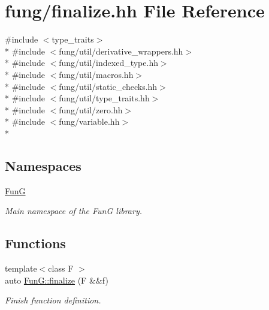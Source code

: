 \hypertarget{finalize_8hh}{}\section{fung/finalize.hh File Reference}
\label{finalize_8hh}
{\ttfamily \#include $<$type\+\_\+traits$>$}\\*
{\ttfamily \#include $<$fung/util/derivative\+\_\+wrappers.\+hh$>$}\\*
{\ttfamily \#include $<$fung/util/indexed\+\_\+type.\+hh$>$}\\*
{\ttfamily \#include $<$fung/util/macros.\+hh$>$}\\*
{\ttfamily \#include $<$fung/util/static\+\_\+checks.\+hh$>$}\\*
{\ttfamily \#include $<$fung/util/type\+\_\+traits.\+hh$>$}\\*
{\ttfamily \#include $<$fung/util/zero.\+hh$>$}\\*
{\ttfamily \#include $<$fung/variable.\+hh$>$}\\*
\subsection*{Namespaces}
\begin{DoxyCompactItemize}
\item 
 \hyperlink{namespaceFunG}{FunG}
\begin{DoxyCompactList}\small\item\em Main namespace of the FunG library. \end{DoxyCompactList}\end{DoxyCompactItemize}
\subsection*{Functions}
\begin{DoxyCompactItemize}
\item 
{\footnotesize template$<$class F $>$ }\\auto \hyperlink{namespaceFunG_ac59f2ececc3cd451860776320a4a93d5}{Fun\+G\+::finalize} (F \&\&f)
\begin{DoxyCompactList}\small\item\em Finish function definition. \end{DoxyCompactList}\end{DoxyCompactItemize}
